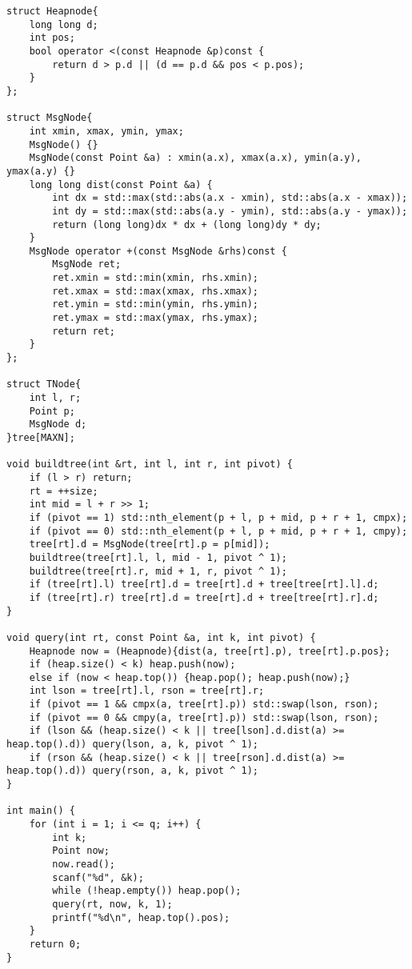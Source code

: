 \begin{lstlisting}
struct Heapnode{
	long long d;
	int pos;
	bool operator <(const Heapnode &p)const {
		return d > p.d || (d == p.d && pos < p.pos);
	}
};

struct MsgNode{
	int xmin, xmax, ymin, ymax;
	MsgNode() {}
	MsgNode(const Point &a) : xmin(a.x), xmax(a.x), ymin(a.y), ymax(a.y) {}
	long long dist(const Point &a) {
		int dx = std::max(std::abs(a.x - xmin), std::abs(a.x - xmax));
		int dy = std::max(std::abs(a.y - ymin), std::abs(a.y - ymax));
		return (long long)dx * dx + (long long)dy * dy;
	}
	MsgNode operator +(const MsgNode &rhs)const {
		MsgNode ret;
		ret.xmin = std::min(xmin, rhs.xmin);
		ret.xmax = std::max(xmax, rhs.xmax);
		ret.ymin = std::min(ymin, rhs.ymin);
		ret.ymax = std::max(ymax, rhs.ymax);
		return ret;
	}
};

struct TNode{
	int l, r;
	Point p;
	MsgNode d;
}tree[MAXN];

void buildtree(int &rt, int l, int r, int pivot) {
	if (l > r) return;
	rt = ++size;
	int mid = l + r >> 1;
	if (pivot == 1) std::nth_element(p + l, p + mid, p + r + 1, cmpx);
	if (pivot == 0) std::nth_element(p + l, p + mid, p + r + 1, cmpy);
	tree[rt].d = MsgNode(tree[rt].p = p[mid]);
	buildtree(tree[rt].l, l, mid - 1, pivot ^ 1);
	buildtree(tree[rt].r, mid + 1, r, pivot ^ 1);
	if (tree[rt].l) tree[rt].d = tree[rt].d + tree[tree[rt].l].d;
	if (tree[rt].r) tree[rt].d = tree[rt].d + tree[tree[rt].r].d;
}

void query(int rt, const Point &a, int k, int pivot) {
	Heapnode now = (Heapnode){dist(a, tree[rt].p), tree[rt].p.pos};
	if (heap.size() < k) heap.push(now);
	else if (now < heap.top()) {heap.pop(); heap.push(now);}
	int lson = tree[rt].l, rson = tree[rt].r;
	if (pivot == 1 && cmpx(a, tree[rt].p)) std::swap(lson, rson);
	if (pivot == 0 && cmpy(a, tree[rt].p)) std::swap(lson, rson);
	if (lson && (heap.size() < k || tree[lson].d.dist(a) >= heap.top().d)) query(lson, a, k, pivot ^ 1);
	if (rson && (heap.size() < k || tree[rson].d.dist(a) >= heap.top().d)) query(rson, a, k, pivot ^ 1);
}

int main() {
	for (int i = 1; i <= q; i++) {
		int k;
		Point now;
		now.read();
		scanf("%d", &k);
		while (!heap.empty()) heap.pop();
		query(rt, now, k, 1);
		printf("%d\n", heap.top().pos);
	}
	return 0;
}
\end{lstlisting}
